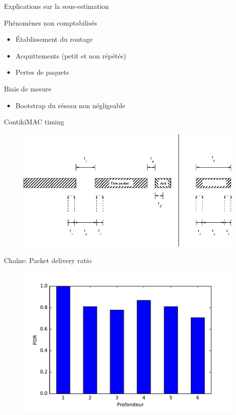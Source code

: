 \begin{frame}{Explications sur la sous-estimation}
  \begin{block}{Phénomènes non comptabilisés}
    \begin{itemize}
      \item Établissement du routage
      \item Acquittements (petit et non répétés)
      \item Pertes de paquets
    \end{itemize}
  \end{block}
  \begin{block}{Biais de mesure}
    \begin{itemize}
      \item Bootstrap du réseau non négligeable
    \end{itemize}
  \end{block}
\end{frame}

\begin{frame}{ContikiMAC timing}
  \begin{figure}
    \centering
    \includegraphics[width=\textwidth]{figures/contikimac_timing.png}
  \end{figure}
\end{frame}

\begin{frame}{Chaîne: Packet delivery ratio}
  \begin{figure}
    \centering
    \includegraphics[width=\textwidth]{figures/new_pdr.pdf}
  \end{figure}
\end{frame}

